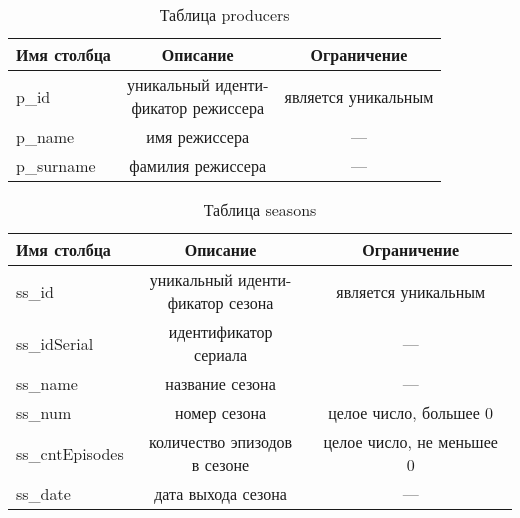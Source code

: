 \begin{table}[H]
    \begin{center}
        \caption{Таблица producers}
        \label{tbl:producers}
        \begin{tabular}{|l|c|c|}
            \hline
            Имя столбца & Описание & Ограничение \\ \hline
            p\_id & \makecell{уникальный иденти-\\фикатор режиссера} & является уникальным \\ \hline
            p\_name & имя режиссера & --- \\ \hline
            p\_surname & фамилия режиссера & --- \\ \hline
        \end{tabular}
    \end{center}
\end{table}

\begin{table}[H]
    \begin{center}
        \caption{Таблица seasons}
        \label{tbl:seasons}
        \begin{tabular}{|l|c|c|}
            \hline
            Имя столбца & Описание & Ограничение \\ \hline
            ss\_id & \makecell{уникальный иденти-\\фикатор сезона} & является уникальным \\ \hline
            ss\_idSerial & идентификатор сериала & ---\\ \hline
            ss\_name & название сезона & ---\\ \hline
            ss\_num & номер сезона & целое число, большее 0\\ \hline
            ss\_cntEpisodes & \makecell{количество эпизодов\\в сезоне} & целое число, не меньшее 0\\ \hline
            ss\_date & дата выхода сезона & ---\\ \hline
        \end{tabular}
    \end{center}
\end{table}

